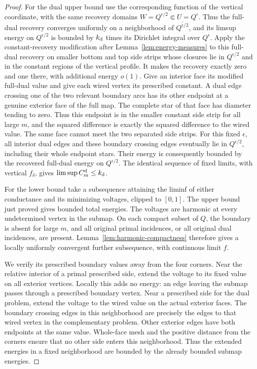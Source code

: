 \begin{proof}
For the dual upper bound use the corresponding function of the vertical
coordinate, with the same recovery domains
\(W=Q^{\epsilon/2}\Subset U=Q^\epsilon\).  Thus the full-dual recovery
converges uniformly on a neighborhood of
\(\overline{Q^{\epsilon/2}}\), and its limsup energy on \(Q^{\epsilon/2}\)
is bounded by \(k_{\rm d}\) times its Dirichlet integral over \(Q^\epsilon\).
Apply the constant-recovery modification after
Lemma~\ref{lem:energy-measures} to this full-dual recovery on smaller
bottom and top side strips whose closures lie in \(Q^{\epsilon/2}\)
and in the constant regions of the vertical profile.  It makes the
recovery exactly zero and one there, with additional energy \(o(1)\).
Give an interior face its modified full-dual value and
give each wired vertex its prescribed constant.  A dual edge crossing
one of the two relevant boundary arcs has its other endpoint at a
genuine exterior face of the full map.  The complete star of that face
has diameter tending to zero.  Thus this endpoint is in the smaller
constant side strip for all large \(m\), and the squared difference is
exactly the squared difference to the wired value.  The same face cannot
meet the two separated side strips.  For this fixed \(\epsilon\), all
interior dual edges and these boundary crossing edges eventually lie in
\(Q^{\epsilon/2}\), including their whole
endpoint stars.  Their energy is consequently bounded by the recovered
full-dual energy on \(Q^{\epsilon/2}\).  The identical sequence of fixed
limits, with vertical \(f_\delta\), gives
\(\limsup C_m^{\rm d}\le k_{\rm d}\).

For the lower bound take a subsequence attaining the liminf of either
conductance and its minimizing voltages, clipped to \([0,1]\).
The upper bound just proved gives bounded total energies.
The voltages are harmonic at every undetermined vertex in the submap.
On each compact subset of \(Q\), the boundary is absent for large \(m\),
and all original primal incidences, or all original dual incidences, are
present.  Lemma~\ref{lem:harmonic-compactness} therefore gives a locally
uniformly convergent further subsequence, with continuous limit \(f\).

We verify its prescribed boundary values away from the four corners.
Near the relative interior of a primal prescribed side, extend the
voltage to its fixed value on all exterior vertices.  Locally this
adds no energy: an edge leaving the submap passes through a prescribed
boundary vertex.  Near a prescribed side for the dual problem, extend
the voltage to the wired value on the actual exterior faces.  The
boundary crossing edges in this neighborhood are precisely the edges
to that wired vertex in the complementary problem.  Other exterior
edges have both endpoints at the same value.  Whole-face mesh and the
positive distance from the corners ensure that no other side enters
this neighborhood.  Thus the extended energies in a fixed neighborhood
are bounded by the already bounded submap energies.


\end{proof}
